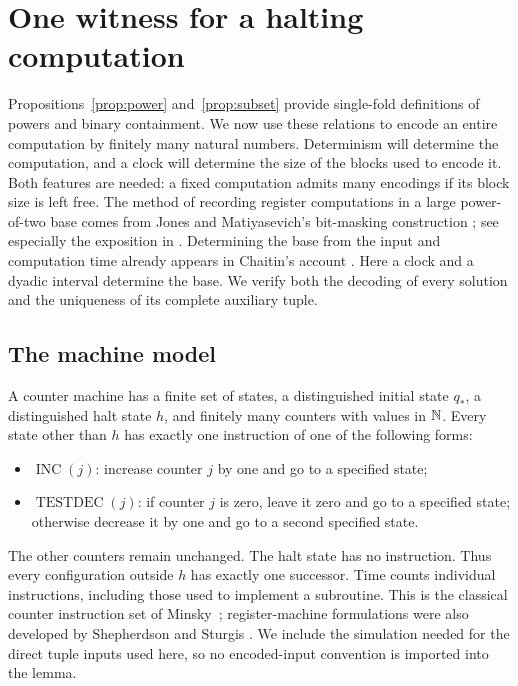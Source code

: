 \section{One witness for a halting computation}\label{sec:computation}

Propositions~\ref{prop:power} and~\ref{prop:subset} provide single-fold
definitions of powers and binary containment. We now use these relations to
encode an entire computation by finitely many natural numbers. Determinism
will determine the computation, and a clock will determine the size of the
blocks used to encode it. Both features are needed: a fixed computation
admits many encodings if its block size is left free.
The method of recording register computations in a large power-of-two
base comes from Jones and Matiyasevich's bit-masking construction
\cite{jm1984}; see especially the exposition in
\cite[Section~4]{jm1991}. Determining the base from the input and
computation time already appears in Chaitin's account
\cite[Sections~2.3 and~2.6]{chaitin1987}. Here a clock and a dyadic
interval determine the base. We verify both the decoding of every
solution and the uniqueness of its complete auxiliary tuple.

\subsection{The machine model}

A counter machine has a finite set of states, a distinguished initial state
$q_*$, a distinguished halt state $h$, and finitely many counters with values
in $\mathbb N$. Every state other than $h$ has exactly one instruction of one of
the following forms:
\begin{itemize}
\item $\operatorname{INC}(j)$: increase counter $j$ by one and go to a
specified state;
\item $\operatorname{TESTDEC}(j)$: if counter $j$ is zero, leave it zero and
go to a specified state; otherwise decrease it by one and go to a second
specified state.
\end{itemize}
The other counters remain unchanged. The halt state has no instruction.
Thus every configuration outside $h$ has exactly one successor. Time counts
individual instructions, including those used to implement a subroutine.
This is the classical counter instruction set of
Minsky~\cite[Theorem~Ia]{minsky1961}; register-machine formulations were
also developed by Shepherdson and Sturgis
\cite[Section~10, Result~10.3]{shepherdson1963}. We include the simulation needed
for the direct tuple inputs used here, so no encoded-input convention is
imported into the lemma.


